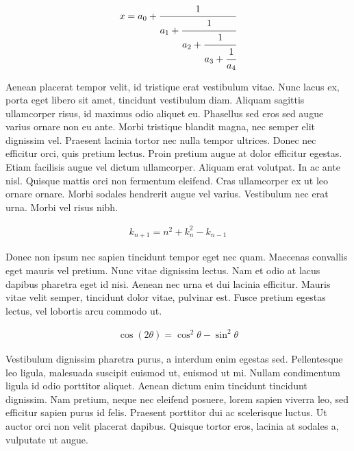 	\begin{equation}
		\begin{aligned}
			x = a_0 + \cfrac{1}{a_1
				+ \cfrac{1}{a_2
					+ \cfrac{1}{a_3 + \cfrac{1}{a_4} } } }
		\end{aligned}
	\end{equation}

Aenean placerat tempor velit, id tristique erat vestibulum vitae. Nunc lacus ex, porta eget libero sit amet, tincidunt vestibulum diam. Aliquam sagittis ullamcorper risus, id maximus odio aliquet eu. Phasellus sed eros sed augue varius ornare non eu ante. Morbi tristique blandit magna, nec semper elit dignissim vel. Praesent lacinia tortor nec nulla tempor ultrices. Donec nec efficitur orci, quis pretium lectus. Proin pretium augue at dolor efficitur egestas. Etiam facilisis augue vel dictum ullamcorper. Aliquam erat volutpat. In ac ante nisl. Quisque mattis orci non fermentum eleifend. Cras ullamcorper ex ut leo ornare ornare. Morbi sodales hendrerit augue vel varius. Vestibulum nec erat urna. Morbi vel risus nibh.

	\begin{equation}
		\begin{aligned}
			k_{n+1} = n^2 + k_n^2 - k_{n-1}
		\end{aligned}
	\end{equation}

Donec non ipsum nec sapien tincidunt tempor eget nec quam. Maecenas convallis eget mauris vel pretium. Nunc vitae dignissim lectus. Nam et odio at lacus dapibus pharetra eget id nisi. Aenean nec urna et dui lacinia efficitur. Mauris vitae velit semper, tincidunt dolor vitae, pulvinar est. Fusce pretium egestas lectus, vel lobortis arcu commodo ut.

	\begin{equation}
		\begin{aligned}
			\cos (2\theta) = \cos^2 \theta - \sin^2 \theta
		\end{aligned}
	\end{equation}
	
Vestibulum dignissim pharetra purus, a interdum enim egestas sed. Pellentesque leo ligula, malesuada suscipit euismod ut, euismod ut mi. Nullam condimentum ligula id odio porttitor aliquet. Aenean dictum enim tincidunt tincidunt dignissim. Nam pretium, neque nec eleifend posuere, lorem sapien viverra leo, sed efficitur sapien purus id felis. Praesent porttitor dui ac scelerisque luctus. Ut auctor orci non velit placerat dapibus. Quisque tortor eros, lacinia at sodales a, vulputate ut augue.

